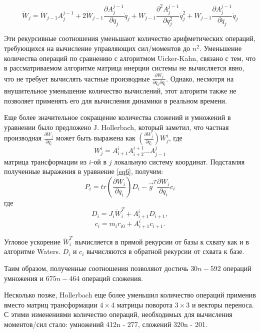 \begin{equation}
\ddot W_j = \ddot W_{j-1} A_j^{j-1} + 2 \dot W_{j-1}
\frac{\partial A_j^{j-1}}{\partial q_j} \dot q_j +
W_{j-1} \frac{\partial^2 A_j^{j-1}}{\partial q_j^2} \dot q_j^2 +
W_{j-1} \frac{\partial A_j^{j-1}}{\partial q_j} \ddot q_j  
\end{equation}

Эти рекурсивные соотношения уменьшают количество арифметических операций, требующихся на вычисление управляющих сил/моментов до $n^2$. Уменьшение количества операций по сравнению с алгоритмом Uicker-Kahn, связано с тем, что в рассматриваемом алгоритме матрица инерции системы не вычисляется явно, что не требует вычислять частные производные $\frac{\partial W_j}{\partial q_k \partial q_l}$. Однако, несмотря на внушительное уменьшение количество вычислений, этот алгоритм также не позволяет применять его для вычисления динамики в реальном времени.

Еще более значительное сокращение количества сложений и умножений в уравнении было предложено J. Hollerbach, который заметил, что частная производная $\frac{\partial W_j}{\partial q_i}$ может быть выражена как $(\frac{\partial W_j}{\partial q_i}) W_j^i$, где
\begin{equation}
W_j^i = A_{i+1}^{i} A_{i+2}^{i+1} ... A_{j-1}^j
\end{equation}
матрица трансформации из $i$-ой в $j$ локальную систему координат. Подставляя полученные выражения в уравнение \ref{eq6}, получим:
\begin{equation}
P_i = tr(\frac{\partial W_i}{\partial q_i}) D_i -
\vec{g}^T \frac{\partial W_i}{\partial q_i} c_i
\end{equation}
где 
\begin{equation}
D_i = J_i \ddot W_i^T + A_{i+1}^{i} D_{i+1},
\end{equation}
\begin{equation}
c_i = m_i r_{i0} + A_{i+1}^{i} c_{i+1}.
\end{equation}

Угловое ускорение $\ddot W_i^T$ вычисляется в прямой рекурсии от базы к схвату как и в алгоритме Waters. $D_i$ и $c_i$ вычисляются в обратной рекурсии от схвата к базе.

Таим образом, полученные соотношения позволяют достичь $30n-592$ операций умножения и $675n - 464$ операций сложения.

Несколько позже, Hollerbach еще более уменьшил количество операций применив вместо матриц трансформации $4 \times 4$ матрицы поворота $3 \times 3$ и векторы переноса. С этими изменениями количество операций, необходимых для вычисления моментов/сил стало: умножений 412n - 277, сложений 320n - 201.

